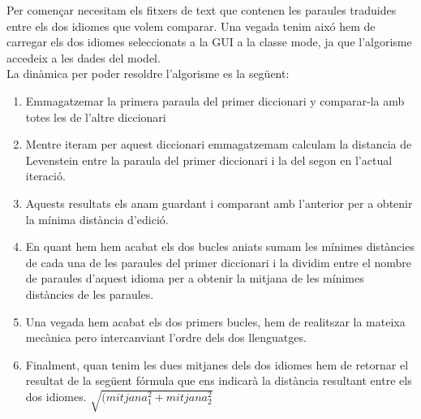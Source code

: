 \documentclass[conference]{IEEEtran}
\begin{document}
 Per començar necesitam els fitxers de text que contenen les paraules traduides entre els dos idiomes que volem comparar. Una vegada tenim aixó hem de carregar els dos idiomes seleccionats a la GUI a la classe mode, ja que l'algorisme accedeix a les dades del model.\\
 La dinàmica per poder resoldre l'algorisme es la següent:
 \begin{enumerate}
     \item Emmagatzemar la primera paraula del primer diccionari y comparar-la amb totes les de l'altre diccionari
     \item Mentre iteram per aquest diccionari emmagatzemam calculam la distancia de Levenstein entre la paraula del primer diccionari i la del segon en l'actual iteració.
     \item Aquests resultats els anam guardant i comparant amb l'anterior per a obtenir la mínima distància d'edició.
     \item En quant hem hem acabat els dos bucles aniats sumam les mínimes distàncies de cada una de les paraules del primer diccionari i la dividim entre el nombre de paraules d'aquest idioma per a obtenir la mitjana de les mínimes distàncies de les paraules.
     \item Una vegada hem acabat els dos primers bucles, hem de realitszar la mateixa mecànica pero intercanviant l'ordre dels dos llenguatges.
     \item Finalment, quan tenim les dues mitjanes dels dos idiomes hem de retornar el resultat de la següent fórmula que ens indicarà la distància resultant entre els dos idiomes.
     $\sqrt{(mitjana_1^2+mitjana_2^2}$
 \end{enumerate}
\end{document}
